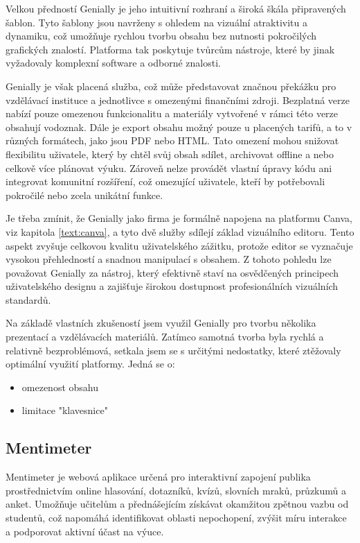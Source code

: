 Velkou předností Genially je jeho intuitivní rozhraní a široká škála připravených šablon.
Tyto šablony jsou navrženy s ohledem na vizuální atraktivitu a dynamiku, což umožňuje rychlou tvorbu obsahu bez nutnosti pokročilých grafických znalostí.
Platforma tak poskytuje tvůrcům nástroje, které by jinak vyžadovaly komplexní software a odborné znalosti.

Genially je však placená služba, což může představovat značnou překážku pro vzdělávací instituce a jednotlivce s omezenými finančními zdroji. 
Bezplatná verze nabízí pouze omezenou funkcionalitu a materiály vytvořené v rámci této verze obsahují vodoznak.
Dále je export obsahu možný pouze u placených tarifů, a to v různých formátech, jako jsou PDF nebo HTML. 
Tato omezení mohou snižovat flexibilitu uživatele, který by chtěl svůj obsah sdílet, archivovat offline a nebo celkově více plánovat výuku. 
Zároveň nelze provádět vlastní úpravy kódu ani integrovat komunitní rozšíření, což omezující uživatele, kteří by potřebovali pokročilé nebo zcela unikátní funkce.

Je třeba zmínit, že Genially jako firma je formálně napojena na platformu Canva, viz kapitola \ref{text:canva}, a tyto dvě služby sdílejí základ vizuálního editoru. 
Tento aspekt zvyšuje celkovou kvalitu uživatelského zážitku, protože editor se vyznačuje vysokou přehledností a snadnou manipulací s obsahem. 
Z tohoto pohledu lze považovat Genially za nástroj, který efektivně staví na osvědčených principech uživatelského designu a zajišťuje širokou dostupnost profesionálních vizuálních standardů.

Na základě vlastních zkušeností jsem využil Genially pro tvorbu několika prezentací a vzdělávacích materiálů. 
Zatímco samotná tvorba byla rychlá a relativně bezproblémová, setkala jsem se s určitými nedostatky, které ztěžovaly optimální využití platformy. 
Jedná se o:

\begin{itemize}
    \item omezenost obsahu
    \item limitace "klavesnice"
\end{itemize}


\subsection{Mentimeter}

Mentimeter je webová aplikace určená pro interaktivní zapojení publika prostřednictvím online hlasování, dotazníků, kvízů, slovních mraků, průzkumů a anket. 
Umožňuje učitelům a přednášejícím získávat okamžitou zpětnou vazbu od studentů, což napomáhá identifikovat oblasti nepochopení, zvýšit míru interakce a podporovat aktivní účast na výuce. 

